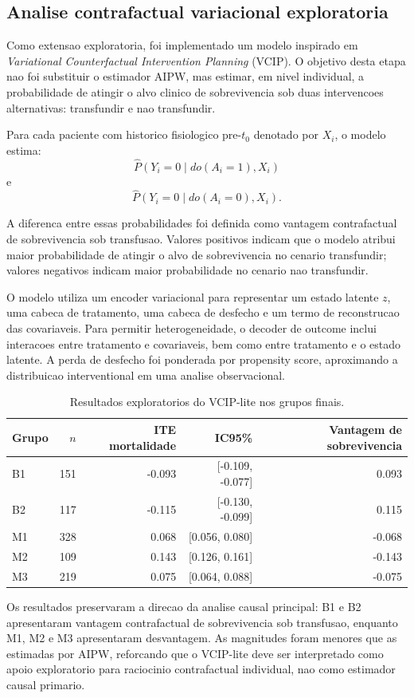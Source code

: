 \subsection{Analise contrafactual variacional exploratoria}

Como extensao exploratoria, foi implementado um modelo inspirado em \textit{Variational Counterfactual Intervention Planning} (VCIP). O objetivo desta etapa nao foi substituir o estimador AIPW, mas estimar, em nivel individual, a probabilidade de atingir o alvo clinico de sobrevivencia sob duas intervencoes alternativas: transfundir e nao transfundir.

Para cada paciente com historico fisiologico pre-$t_0$ denotado por $X_i$, o modelo estima:
\[
\widehat{P}(Y_i=0 \mid do(A_i=1), X_i)
\]
e
\[
\widehat{P}(Y_i=0 \mid do(A_i=0), X_i).
\]

A diferenca entre essas probabilidades foi definida como vantagem contrafactual de sobrevivencia sob transfusao. Valores positivos indicam que o modelo atribui maior probabilidade de atingir o alvo de sobrevivencia no cenario transfundir; valores negativos indicam maior probabilidade no cenario nao transfundir.

O modelo utiliza um encoder variacional para representar um estado latente $z$, uma cabeca de tratamento, uma cabeca de desfecho e um termo de reconstrucao das covariaveis. Para permitir heterogeneidade, o decoder de outcome inclui interacoes entre tratamento e covariaveis, bem como entre tratamento e o estado latente. A perda de desfecho foi ponderada por propensity score, aproximando a distribuicao interventional em uma analise observacional.

\begin{table}[htbp]
\centering
\small
\caption{Resultados exploratorios do VCIP-lite nos grupos finais.}
\begin{tabular}{lrrrr}
\toprule
Grupo & $n$ & ITE mortalidade & IC95\% & Vantagem de sobrevivencia \\
\midrule
B1 & 151 & -0.093 & [-0.109, -0.077] & 0.093 \\
B2 & 117 & -0.115 & [-0.130, -0.099] & 0.115 \\
M1 & 328 & 0.068 & [0.056, 0.080] & -0.068 \\
M2 & 109 & 0.143 & [0.126, 0.161] & -0.143 \\
M3 & 219 & 0.075 & [0.064, 0.088] & -0.075 \\
\bottomrule
\end{tabular}
\end{table}

Os resultados preservaram a direcao da analise causal principal: B1 e B2 apresentaram vantagem contrafactual de sobrevivencia sob transfusao, enquanto M1, M2 e M3 apresentaram desvantagem. As magnitudes foram menores que as estimadas por AIPW, reforcando que o VCIP-lite deve ser interpretado como apoio exploratorio para raciocinio contrafactual individual, nao como estimador causal primario.
